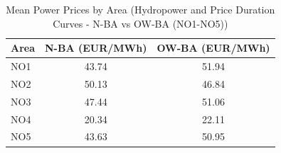 \begin{table}[htbp]
\centering
\caption{Mean Power Prices by Area (Hydropower and Price Duration Curves - N-BA vs OW-BA (NO1-NO5))}
\label{tab:mean_prices_NO_areas_N_BA_OW_BA}
\begin{tabular}{lcc}
\hline
Area & N-BA (EUR/MWh) & OW-BA (EUR/MWh) \\
\hline
NO1 & 43.74 & 51.94 \\
NO2 & 50.13 & 46.84 \\
NO3 & 47.44 & 51.06 \\
NO4 & 20.34 & 22.11 \\
NO5 & 43.63 & 50.95 \\
\hline
\end{tabular}
\end{table}